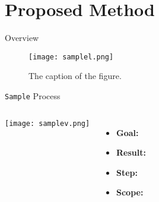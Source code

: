 \section{Proposed Method} 

\begin{frame}{Overview}
	\begin{figure}
		\centering
		\texttt{[image: samplel.png]}
		\caption{The caption of the figure.}
	\end{figure}	
	\note{}
\end{frame}


\begin{frame}[label=process1]{\texttt{Sample} Process 
  \hyperlink{algo1}{} 
  \hyperlink{pseudocode1}{}
}
	\begin{columns}
		\centering
		\texttt{[image: samplev.png]}
		\begin{itemize}
			\item \textbf{Goal:}
			\item \textbf{Result:}
			\item \textbf{Step:} 
			\item \textbf{Scope:}
		\end{itemize}
	\end{columns}
	\note{}
\end{frame}